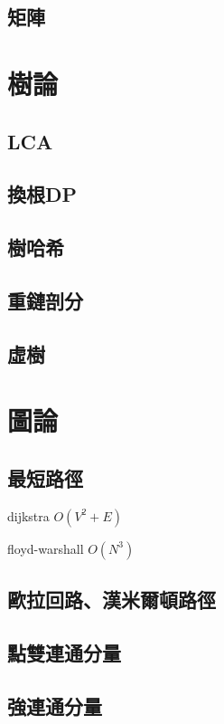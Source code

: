 \documentclass[a4paper,10pt,twocolumn,oneside]{article}
\begin{document}
\subsection{矩陣}



\section{樹論}
\subsection{LCA}

\subsection{換根DP}

\subsection{樹哈希}

\subsection{重鏈剖分}

\subsection{虛樹}


\section{圖論}
\subsection{最短路徑}
dijkstra $O({V}^2 + E)$

floyd-warshall $O({N}^3)$

\subsection{歐拉回路、漢米爾頓路徑}


\subsection{點雙連通分量}

\subsection{強連通分量}

\end{document}
